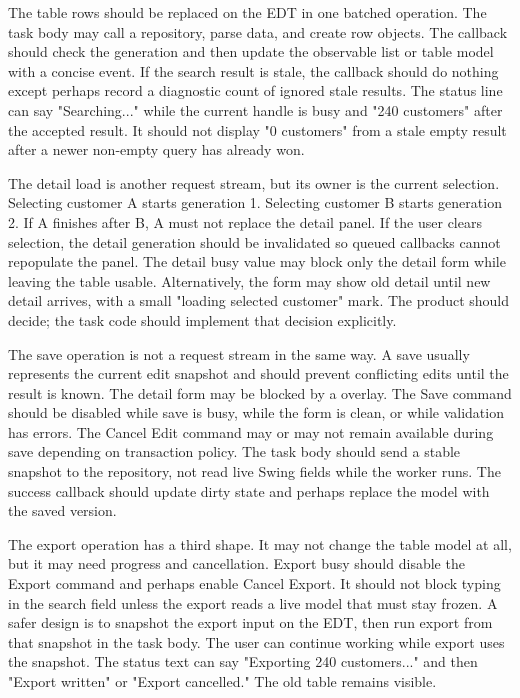 The table rows should be replaced on the EDT in one batched operation. The task
body may call a repository, parse data, and create row objects. The callback
should check the generation and then update the observable list or table model
with a concise event. If the search result is stale, the callback should do
nothing except perhaps record a diagnostic count of ignored stale results. The
status line can say "Searching..." while the current handle is busy and "240
customers" after the accepted result. It should not display "0 customers" from
a stale empty result after a newer non-empty query has already won.

The detail load is another request stream, but its owner is the current
selection. Selecting customer A starts generation 1. Selecting customer B starts
generation 2. If A finishes after B, A must not replace the detail panel. If
the user clears selection, the detail generation should be invalidated so
queued callbacks cannot repopulate the panel. The detail busy value may block
only the detail form while leaving the table usable. Alternatively, the form may
show old detail until new detail arrives, with a small "loading selected
customer" mark. The product should decide; the task code should implement that
decision explicitly.

The save operation is not a request stream in the same way. A save usually
represents the current edit snapshot and should prevent conflicting edits until
the result is known. The detail form may be blocked by a  overlay.
The Save command should be disabled while save is busy, while the form is clean,
or while validation has errors. The Cancel Edit command may or may not remain
available during save depending on transaction policy. The task body should
send a stable snapshot to the repository, not read live Swing fields while the
worker runs. The success callback should update dirty state and perhaps replace
the model with the saved version.

The export operation has a third shape. It may not change the table model at
all, but it may need progress and cancellation. Export busy should disable the
Export command and perhaps enable Cancel Export. It should not block typing in
the search field unless the export reads a live model that must stay frozen.
A safer design is to snapshot the export input on the EDT, then run export from
that snapshot in the task body. The user can continue working while export
uses the snapshot. The status text can say "Exporting 240 customers..." and
then "Export written" or "Export cancelled." The old table remains visible.

